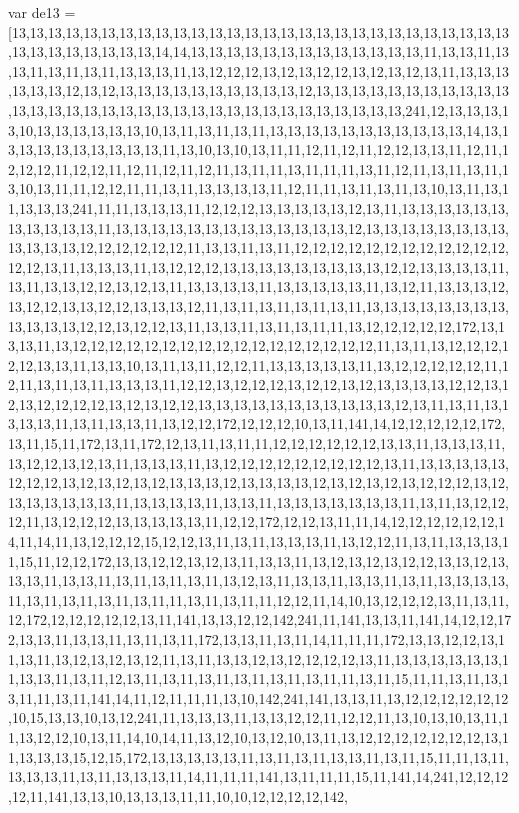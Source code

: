 var de13 = [13,13,13,13,13,13,13,13,13,13,13,13,13,13,13,13,13,13,13,13,13,13,13,13,13,13,13,13,13,13,13,13,13,13,13,13,14,14,13,13,13,13,13,13,13,13,13,13,13,13,13,11,13,13,11,13,13,11,13,11,13,11,13,13,13,11,13,12,12,12,13,12,13,12,12,13,12,13,12,13,11,13,13,13,13,13,13,12,13,12,13,13,13,13,13,13,13,13,13,13,12,13,13,13,13,13,13,13,13,13,13,13,13,13,13,13,13,13,13,13,13,13,13,13,13,13,13,13,13,13,13,13,13,13,241,12,13,13,13,13,10,13,13,13,13,13,13,10,13,11,13,11,13,11,13,13,13,13,13,13,13,13,13,13,13,14,13,13,13,13,13,13,13,13,13,13,11,13,10,13,10,13,11,11,12,11,12,11,12,12,13,13,11,12,11,12,12,12,11,12,12,11,12,11,12,11,12,11,13,11,11,13,11,11,11,13,11,12,11,13,11,13,11,13,10,13,11,11,12,12,11,11,13,11,13,13,13,13,11,12,11,11,13,11,13,11,13,10,13,11,13,11,13,13,13,241,11,11,13,13,13,11,12,12,12,13,13,13,13,13,12,13,11,13,13,13,13,13,13,13,13,13,13,13,11,13,13,13,13,13,13,13,13,13,13,13,13,13,12,13,13,13,13,13,13,13,13,13,13,13,13,12,12,12,12,12,12,11,13,13,11,13,11,12,12,12,12,12,12,12,12,12,12,12,12,12,12,13,11,13,13,13,11,13,12,12,12,13,13,13,13,13,13,13,13,13,12,12,13,13,13,13,11,13,11,13,13,12,12,13,12,13,11,13,13,13,13,11,13,13,13,13,13,11,13,12,11,13,13,13,12,13,12,12,13,13,12,12,13,13,13,12,11,13,11,13,11,13,11,13,11,13,13,13,13,13,13,13,13,13,13,13,13,12,12,13,12,12,13,11,13,13,11,13,11,13,11,11,13,12,12,12,12,12,172,13,13,13,11,13,12,12,12,12,12,12,12,12,12,12,12,12,12,12,12,12,12,11,13,11,13,12,12,12,12,12,13,13,11,13,13,10,13,11,13,11,12,12,11,13,13,13,13,13,11,13,12,12,12,12,12,11,12,11,13,11,13,11,13,13,13,11,12,12,13,12,12,12,13,12,12,13,12,13,13,13,13,12,12,13,12,13,12,12,12,12,13,12,13,12,12,13,13,13,13,13,13,13,13,13,13,13,12,13,11,13,11,13,13,13,13,11,13,11,13,13,11,13,12,12,172,12,12,12,10,13,11,141,14,12,12,12,12,12,172,13,11,15,11,172,13,11,172,12,13,11,13,11,11,12,12,12,12,12,12,13,13,11,13,13,13,11,13,12,12,13,12,13,11,13,13,13,11,13,12,12,12,12,12,12,12,12,12,13,11,13,13,13,13,13,12,12,12,13,12,13,12,13,12,13,13,13,12,13,13,13,13,12,13,12,13,12,13,12,12,12,13,12,13,13,13,13,13,13,11,13,13,13,13,11,13,13,11,13,13,13,13,13,13,13,11,13,11,13,12,12,12,11,13,12,12,12,13,13,13,13,13,11,12,12,172,12,12,13,11,11,14,12,12,12,12,12,12,14,11,14,11,13,12,12,12,15,12,12,13,11,13,11,13,13,13,11,13,12,12,11,13,11,13,13,13,11,15,11,12,12,172,13,13,12,12,13,12,13,11,13,13,11,13,12,13,12,13,12,12,13,13,12,13,13,13,11,13,13,11,13,11,13,11,13,11,13,12,13,11,13,13,11,13,13,11,13,11,13,13,13,13,11,13,11,13,11,13,11,13,11,11,13,11,13,11,11,12,12,11,14,10,13,12,12,12,13,11,13,11,12,172,12,12,12,12,12,13,11,141,13,13,12,12,142,241,11,141,13,13,11,141,14,12,12,172,13,13,11,13,13,11,13,11,13,11,172,13,13,11,13,11,14,11,11,11,172,13,13,12,12,13,11,13,11,13,12,13,12,13,12,11,13,11,13,13,12,13,12,12,12,12,13,11,13,13,13,13,13,13,11,13,13,11,13,11,12,13,11,13,11,13,11,13,11,13,11,13,11,11,13,11,15,11,11,13,11,13,13,11,11,13,11,141,14,11,12,11,11,11,13,10,142,241,141,13,13,11,13,12,12,12,12,12,12,10,15,13,13,10,13,12,241,11,13,13,13,11,13,13,12,12,11,12,12,11,13,10,13,10,13,11,11,13,12,12,10,13,11,14,10,14,11,13,12,10,13,12,10,13,11,13,12,12,12,12,12,12,12,13,11,13,13,13,15,12,15,172,13,13,13,13,13,11,13,11,13,11,13,13,11,13,11,15,11,11,13,11,13,13,13,11,13,11,13,13,13,11,14,11,11,11,141,13,11,11,11,15,11,141,14,241,12,12,12,12,11,141,13,13,10,13,13,13,11,11,10,10,12,12,12,12,142,